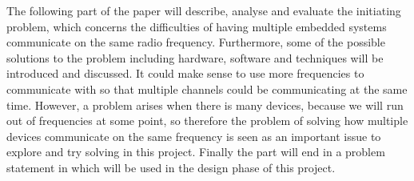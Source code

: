 \newpage
The following part of the paper will describe, analyse and evaluate the initiating problem, which concerns the difficulties of having multiple embedded systems communicate on the same radio frequency.
Furthermore, some of the possible solutions to the problem including hardware, software and techniques will be introduced and discussed.
It could make sense to use more frequencies to communicate with so that multiple channels could be communicating at the same time.
However, a problem arises when there is many devices, because we will run out of frequencies at some point, so therefore the problem of solving how multiple devices communicate on the same frequency is seen as an important issue to explore and try solving in this project.
Finally the part will end in a problem statement in  which will be used in the design phase of this project.